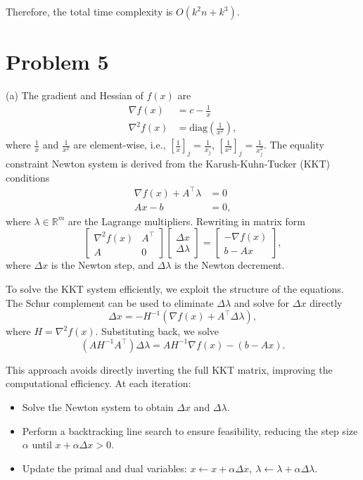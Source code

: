 \documentclass[11pt]{article}
\begin{document}
Therefore, the total time complexity is $O(k^2n + k^3)$.

\clearpage
\section*{Problem 5}

(a) 
The gradient and Hessian of \(f(x)\) are
\begin{align*}
  \nabla f(x) &= c - \frac{1}{x}\\
  \nabla^2 f(x) &= \text{diag}\left(\frac{1}{x^2}\right),
\end{align*}
where \(\frac{1}{x}\) and \(\frac{1}{x^2}\) are element-wise, i.e., \(\left[\frac{1}{x}\right]_j = \frac{1}{x_j}\), \(\left[\frac{1}{x^2}\right]_j = \frac{1}{x_j^2}\).
The equality constraint Newton system is derived from the Karush-Kuhn-Tucker (KKT) conditions
\[
\begin{aligned}
    \nabla f(x) + A^\top \lambda &= 0 \\
    Ax - b &= 0,
\end{aligned}
\]
where \(\lambda \in \mathbb{R}^m\) are the Lagrange multipliers.
Rewriting in matrix form
\[
\begin{bmatrix}
    \nabla^2 f(x) & A^\top \\
    A & 0
\end{bmatrix}
\begin{bmatrix}
    \Delta x \\
    \Delta \lambda
\end{bmatrix}
=
\begin{bmatrix}
    -\nabla f(x) \\
    b - Ax
\end{bmatrix},
\]
where \(\Delta x\) is the Newton step, and \(\Delta \lambda\) is the Newton decrement.

To solve the KKT system efficiently, we exploit the structure of the equations. The Schur complement can be used to eliminate \(\Delta \lambda\) and solve for \(\Delta x\) directly
\[
\Delta x = -H^{-1}(\nabla f(x) + A^\top \Delta \lambda),
\]
where \(H = \nabla^2 f(x)\).
Substituting back, we solve
\[
(AH^{-1}A^\top)\Delta \lambda = A H^{-1} \nabla f(x) - (b - Ax).
\]

This approach avoids directly inverting the full KKT matrix, improving the computational efficiency.
At each iteration:
\begin{itemize}
  \item Solve the Newton system to obtain \(\Delta x\) and \(\Delta \lambda\).
  \item Perform a backtracking line search to ensure feasibility, reducing the step size \(\alpha\) until \(x + \alpha \Delta x > 0\).
  \item Update the primal and dual variables:
  \(
  x \gets x + \alpha \Delta x, \  \lambda \gets \lambda + \alpha \Delta \lambda.
  \)
\end{itemize}
\end{document}
